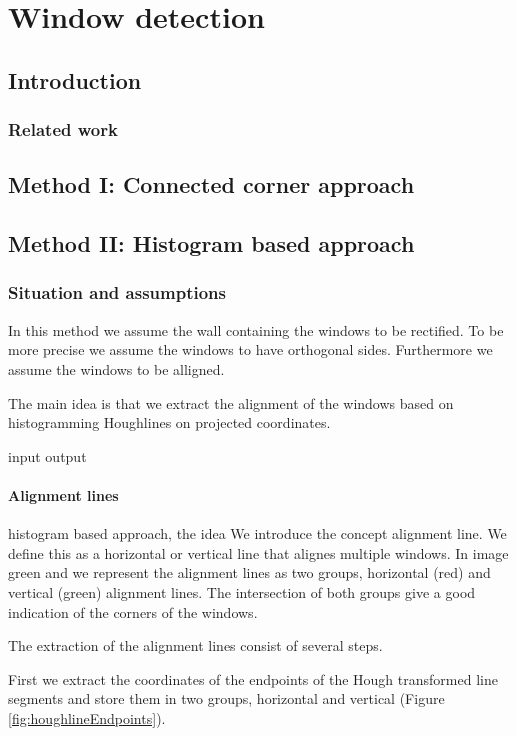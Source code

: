 \section{Window detection}
\label{chap:windowDetection}
\subsection{Introduction}
\subsubsection{Related work}

\subsection{Method I: Connected corner approach} 
\subsection{Method II: Histogram based approach} 
\subsubsection{Situation and assumptions}
In this method we assume the wall containing the windows to be rectified.
To be more precise we assume the windows to have orthogonal sides.
Furthermore we assume the windows to be alligned.

The main idea is that we extract the alignment of the windows based on
histogramming Houghlines on projected coordinates.

input 
output


\paragraph{Alignment lines}
histogram based approach, the idea
We introduce the concept alignment line. We define this as a horizontal or
vertical line that alignes multiple windows. In image %
green and we represent the alignment lines as two groups, horizontal (red) and
vertical (green) alignment lines. The intersection of both groups give a good
indication of the corners of the windows.

The extraction of the alignment lines consist of several steps.

First we extract the coordinates of the endpoints of the Hough transformed line
segments and store them in two groups, horizontal and vertical (Figure
\ref{fig:houghlineEndpoints}). 

